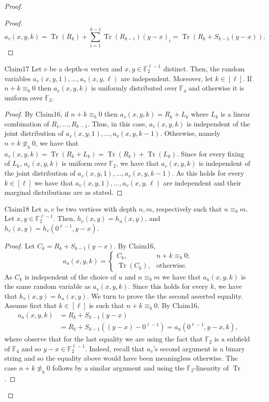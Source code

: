 \begin{proof}
\begin{proof}
\[
a_v(x,y,k)=\operatorname{Tr}(R_k)+\sum_{i=1}^{k-1}\operatorname{Tr}(R_{k-i})(y-x)_i
=\operatorname{Tr}(R_k+S_{k-1}(y-x)).
\]
\end{proof}
\begin{authorclaim}{Claim17}
Let $v$ be a depth-$n$ vertex and $x,y\in\mathbb F_2^{\ell-1}$ distinct. Then, the random variables $a_v(x,y,1),\ldots,a_v(x,y,\ell)$ are independent. Moreover, let $k\in[\ell]$. If $n+k\equiv_b0$ then $a_v(x,y,k)$ is uniformly distributed over $\mathbb F_4$ and otherwise it is uniform over $\mathbb F_2$.
\end{authorclaim}
\begin{proof}
By Claim16, if $n+k\equiv_b0$ then $a_v(x,y,k)=R_k+L_k$ where $L_k$ is a linear combination of $R_1,\ldots,R_{k-1}$. Thus, in this case, $a_v(x,y,k)$ is independent of the joint distribution of $a_v(x,y,1),\ldots,a_v(x,y,k-1)$. Otherwise, namely $n+k\not\equiv_b0$, we have that $a_v(x,y,k)=\operatorname{Tr}(R_k+L_k)=\operatorname{Tr}(R_k)+\operatorname{Tr}(L_k)$. Since for every fixing of $L_k$, $a_v(x,y,k)$ is uniform over $\mathbb F_2$, we have that $a_v(x,y,k)$ is independent of the joint distribution of $a_v(x,y,1),\ldots,a_v(x,y,k-1)$. As this holds for every $k\in[\ell]$ we have that $a_v(x,y,1),\ldots,a_v(x,y,\ell)$ are independent and their marginal distributions are as stated.
\end{proof}
\begin{authorclaim}{Claim18}
Let $u,v$ be two vertices with depth $n,m$, respectively such that $n\equiv_bm$. Let $x,y\in\mathbb F_2^{\ell-1}$. Then, $h_v(x,y)=h_u(x,y)$, and $h_v(x,y)=h_v(0^{\ell-1},y-x)$.
\end{authorclaim}
\begin{proof}
Let $C_k=R_k+S_{k-1}(y-x)$. By Claim16,
\[
a_u(x,y,k)=\begin{cases}C_k,&n+k\equiv_b0;\\\operatorname{Tr}(C_k),&\text{otherwise}.\end{cases}
\]
As $C_k$ is independent of the choice of $u$ and $n\equiv_bm$ we have that $a_u(x,y,k)$ is the same random variable as $a_v(x,y,k)$. Since this holds for every $k$, we have that $h_v(x,y)=h_u(x,y)$.
We turn to prove the the second asserted equality. Assume first that $k\in[\ell]$ is such that $n+k\equiv_b0$. By Claim16,
\begin{align*}
a_u(x,y,k)&=R_k+S_{k-1}(y-x)\\
&=R_k+S_{k-1}((y-x)-0^{\ell-1})
=a_u(0^{\ell-1},y-x,k),
\end{align*}
where observe that for the last equality we are using the fact that $\mathbb F_2$ is a subfield of $\mathbb F_4$ and so $y-x\in\mathbb F_2^{\ell-1}$. Indeed, recall that $a_v$'s second argument is a binary string and so the equality above would have been meaningless otherwise. The case $n+k\not\equiv_b0$ follows by a similar argument and using the $\mathbb F_2$-linearity of $\operatorname{Tr}$.

\end{proof}
\end{proof}
